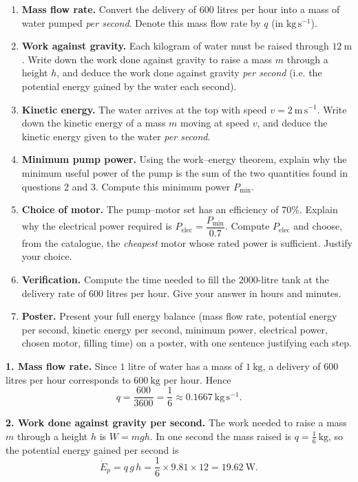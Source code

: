 \documentclass[11pt]{article}
\newcounter{popsec}
\newcounter{popsub}
\newcommand{\courssub}[1]{%
  \stepcounter{popsub}%
  \par\vspace{9pt}\noindent{\popxbold\fontsize{11.5}{13}\selectfont\color{popink}{\color{poporange}\thepopsec.\thepopsub}\hspace{6pt}#1}\par\nopagebreak\vspace{4pt}
}
\begin{document}
\begin{enumerate}
\item \textbf{Mass flow rate.} Convert the delivery of $600$ litres per hour into a mass of water pumped \emph{per second}. Denote this mass flow rate by $q$ (in $\mathrm{kg\,s^{-1}}$).
\item \textbf{Work against gravity.} Each kilogram of water must be raised through $12\ \mathrm{m}$. Write down the work done against gravity to raise a mass $m$ through a height $h$, and deduce the work done against gravity \emph{per second} (i.e. the potential energy gained by the water each second).
\item \textbf{Kinetic energy.} The water arrives at the top with speed $v = 2\ \mathrm{m\,s^{-1}}$. Write down the kinetic energy of a mass $m$ moving at speed $v$, and deduce the kinetic energy given to the water \emph{per second}.
\item \textbf{Minimum pump power.} Using the work--energy theorem, explain why the minimum useful power of the pump is the sum of the two quantities found in questions 2 and 3. Compute this minimum power $P_{\min}$.
\item \textbf{Choice of motor.} The pump--motor set has an efficiency of $70\%$. Explain why the electrical power required is $P_{\mathrm{elec}} = \dfrac{P_{\min}}{0.7}$. Compute $P_{\mathrm{elec}}$ and choose, from the catalogue, the \emph{cheapest} motor whose rated power is sufficient. Justify your choice.
\item \textbf{Verification.} Compute the time needed to fill the $2000$-litre tank at the delivery rate of $600$ litres per hour. Give your answer in hours and minutes.
\item \textbf{Poster.} Present your full energy balance (mass flow rate, potential energy per second, kinetic energy per second, minimum power, electrical power, chosen motor, filling time) on a poster, with one sentence justifying each step.
\end{enumerate}

\courssub{Model answer}

\textbf{1. Mass flow rate.} Since $1$ litre of water has a mass of $1\ \mathrm{kg}$, a delivery of $600$ litres per hour corresponds to $600\ \mathrm{kg}$ per hour. Hence
\[
q=\frac{600}{3600}=\frac{1}{6}\approx 0.1667\ \mathrm{kg\,s^{-1}}.
\]

\textbf{2. Work done against gravity per second.} The work needed to raise a mass $m$ through a height $h$ is $W = mgh$. In one second the mass raised is $q = \tfrac{1}{6}\ \mathrm{kg}$, so the potential energy gained per second is
\[
\dot{E}_{p}=q\,g\,h=\frac{1}{6}\times 9.81\times 12 = 19.62\ \mathrm{W}.
\]
\end{document}
